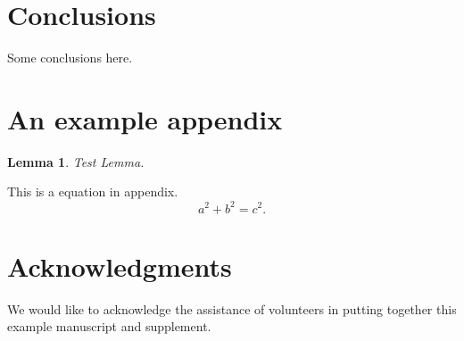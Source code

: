 \documentclass[10pt,reqno,final]{article}
\numberwithin{equation}{section}
\numberwithin{figure}{section}
\numberwithin{table}{section}
\theoremstyle{plain}
\newtheorem{lemma}{Lemma}[section]
\theoremstyle{definition}
\theoremstyle{remark}
\begin{document}
\lipsum[76]

\section{Conclusions}
\label{sec:conclusions}

Some conclusions here.


\appendix
\section{An example appendix}
\lipsum[71]

\begin{lemma}
Test Lemma.
\end{lemma}

This is a equation in appendix.
\begin{equation}\label{equ:A1}
  a^2+b^2=c^2.
\end{equation}


\section*{Acknowledgments}
We would like to acknowledge the assistance of volunteers in putting
together this example manuscript and supplement.



%


\end{document}

